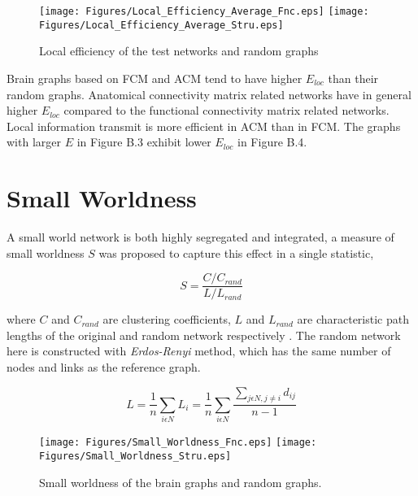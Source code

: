 \begin{figure}[htbp]
 
  \centering
	 \texttt{[image: Figures/Local\_Efficiency\_Average\_Fnc.eps]}
	 \texttt{[image: Figures/Local\_Efficiency\_Average\_Stru.eps]}
  \caption[Local Efficiency]{Local efficiency of the test networks and random graphs} 
    \label{fig:Local Efficiency}
 	
\end{figure}

Brain graphs based on FCM and ACM tend to have higher $E_{loc}$ than their random graphs. Anatomical connectivity matrix related networks have in general higher $E_{loc}$ compared to the functional connectivity matrix related networks. Local information transmit is more efficient in ACM than in FCM. The graphs with larger $E$ in Figure B.3 exhibit lower $E_{loc}$ in Figure B.4.   


\section{Small Worldness}

A small world network is both highly segregated and integrated, a measure of small worldness $S$ was proposed to capture this effect in a single statistic,

\begin{equation}
S = \frac{C/C_{rand}}{L/L_{rand}}
\end{equation}
 
where $C$ and $C_{rand}$ are clustering coefficients, $L$ and $L_{rand}$ are characteristic path lengths of the original and random network respectively \citep{HUM08}. The random network here is constructed with \textit{Erdos-Renyi} method, which has the same number of nodes and links as the reference graph. 

\begin{equation}
L = \frac{1}{n}\sum\limits_{i \epsilon N} L_i = \frac{1}{n}\sum\limits_{i \epsilon N} \frac{\sum\limits_{j \epsilon N, j \neq i }d_{ij}}{n-1 } 
\end{equation}


\begin{figure}[htbp]
 
  \centering
	 \texttt{[image: Figures/Small\_Worldness\_Fnc.eps]}
	 \texttt{[image: Figures/Small\_Worldness\_Stru.eps]}
  \caption[Small Worldness]{Small worldness of the brain graphs and random graphs.} 
    \label{fig:Small Worldness}
 	
\end{figure}


